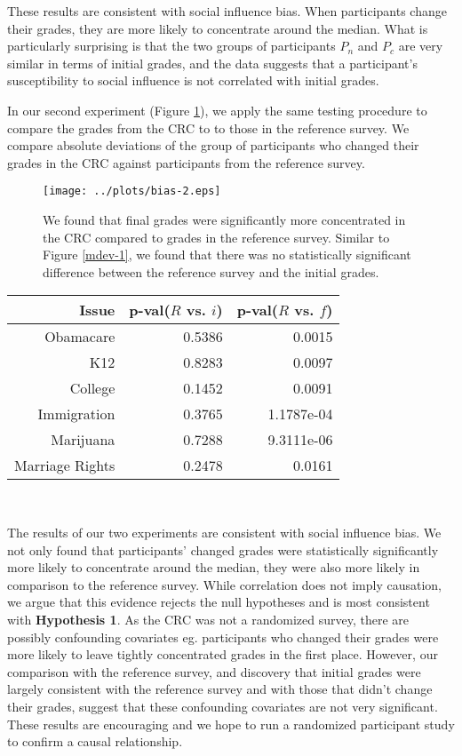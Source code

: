 These results are consistent with social influence bias.
When participants change their grades, they are more likely to concentrate around the median.
What is particularly surprising is that the two groups of participants $P_n$ and $P_c$ are very similar in terms of initial grades, and the data suggests that a participant's susceptibility to social influence is not correlated with initial grades.

In our second experiment (Figure \ref{mdev-2}), we apply the same testing procedure to compare the grades from the CRC to to those in the reference survey.
We compare absolute deviations of the group of participants who changed their grades in the CRC against participants from the reference survey.
\begin{figure}[h]
\centering
    \texttt{[image: ../plots/bias-2.eps]}
      \caption{We found that final grades were significantly more concentrated in the CRC compared to grades in the reference survey. Similar to Figure \ref{mdev-1}, we found that there was no statistically significant difference between the reference survey and the initial grades.}
      \label{mdev-2}
\end{figure}

{\centering
\scriptsize
\begin{tabular}[!ht] { r | r | r }
\label{ref-1}
  Issue & p-val($R$ vs. $i$) & p-val($R$ vs. $f$) \\
  \hline
  \hline
  Obamacare &  0.5386 & 0.0015 \\
  \hline
  K12 & 0.8283 & 0.0097 \\
  \hline
  College & 0.1452 & 0.0091 \\
  \hline
  Immigration & 0.3765 & 1.1787e-04\\
  \hline
  Marijuana & 0.7288 & 9.3111e-06\\
  \hline
  Marriage Rights & 0.2478 & 0.0161 \\
\end{tabular}\\[1\baselineskip]
}

The results of our two experiments are consistent with social influence bias.
We not only found that participants' changed grades were statistically significantly more likely to concentrate around the median, they were also more likely in comparison to the reference survey.
While correlation does not imply causation, we argue that this evidence rejects the null hypotheses and is most consistent with \textbf{Hypothesis 1}.
As the CRC was not a randomized survey, there are possibly confounding covariates eg. participants who changed their grades were more likely to leave tightly concentrated grades in the first place.
However, our comparison with the reference survey, and discovery that initial grades were largely consistent with the reference survey and with those that didn't change their grades, suggest that these confounding covariates are not very significant.
These results are encouraging and we hope to run a randomized participant study to confirm a causal relationship.

